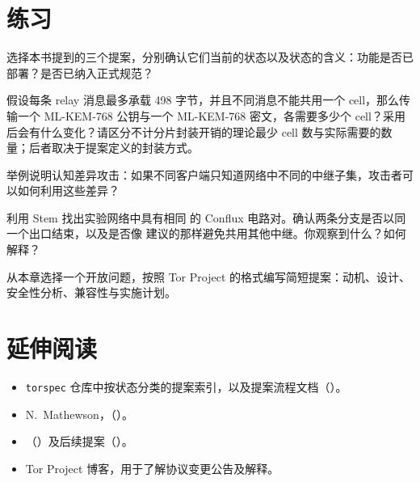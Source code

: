 \section*{练习}

\begin{esercizio}[1]\label{es:31-stato}
选择本书提到的三个提案，分别确认它们当前的状态以及状态的含义：功能是否已部署？是否已纳入正式规范？
\end{esercizio}

\begin{esercizio}[1]\label{es:31-celle}
假设每条 relay 消息最多承载 498 字节，并且不同消息不能共用一个 cell，那么传输一个 ML-KEM-768 公钥与一个 ML-KEM-768 密文，各需要多少个 cell？采用  后会有什么变化？请区分不计分片封装开销的理论最少 cell 数与实际需要的数量；后者取决于提案定义的封装方式。
\end{esercizio}

\begin{esercizio}[2]\label{es:31-epistemico}
举例说明认知差异攻击：如果不同客户端只知道网络中不同的中继子集，攻击者可以如何利用这些差异？
\end{esercizio}

\begin{esercizio}[2]\label{es:31-conflux}
利用 Stem 找出实验网络中具有相同  的 Conflux 电路对。确认两条分支是否以同一个出口结束，以及是否像  建议的那样避免共用其他中继。你观察到什么？如何解释？
\end{esercizio}

\begin{esercizio}[3]\label{es:31-proposta}
从本章选择一个开放问题，按照 Tor Project 的格式编写简短提案：动机、设计、安全性分析、兼容性与实施计划。
\end{esercizio}

\section*{延伸阅读}
\begin{itemize}
  \item \texttt{torspec} 仓库中按状态分类的提案索引，以及提案流程文档（）。
  \item N.~Mathewson，（）。
  \item {}（）及后续提案（）。
  \item Tor Project 博客，用于了解协议变更公告及解释。
\end{itemize}
